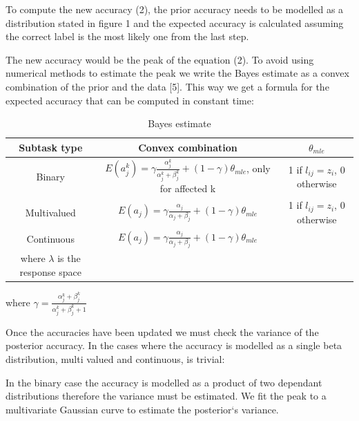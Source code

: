 \documentclass[11pt]{article}
\begin{document}
To compute the new accuracy (2), the prior accuracy needs to be modelled as a distribution stated in figure 1 and the expected accuracy is calculated assuming the correct label is the most likely one from the last step.

The new accuracy would be the peak of the equation (2). To avoid using numerical methods to estimate the peak we write the Bayes estimate as a convex combination of the prior and the data [5]. This way we get a formula for the expected accuracy that can be computed in constant time:\\

\begin{table}[htdp]
\caption{Bayes estimate}
\begin{center}
\begin{tabular}{|c|c|c|}
Subtask type & Convex combination & $\theta_{mle}$\\ \hline

Binary & $ E(a_{j}^{k}) = \gamma \frac{\alpha_{j}^{k}}{\alpha_{j}^{k} + \beta_{j}^{k}} +  (1 - \gamma)\theta_{mle}$, only for affected k & 1 if $l_{ij} = z_{i}$, 0 otherwise\\

Multivalued & $ E(a_{j}) = \gamma \frac{\alpha_{j}}{\alpha_{j} + \beta_{j}} +  (1 - \gamma)\theta_{mle}$ &1 if $l_{ij} = z_{i}$, 0 otherwise\\

Continuous & $ E(a_{j}) = \gamma \frac{\alpha_{j}}{\alpha_{j} + \beta_{j}} +  (1 - \gamma)\theta_{mle}$ & \shortstack{$\frac{\mathcal{N}(l_{ij}| z_{i}, \sum)}{\mathcal{N}(l_{ij}| z_{i}, \sum) + \lambda^{-1}}$ \\ where $\lambda$ is the response space}\\
\end{tabular}
\end{center}
\label{def}
\end{table}%

where $\gamma = \frac{\alpha_{j}^{k} + \beta_{j}^{k}}{\alpha_{j}^{k} + \beta_{j}^{k} + 1}$ 

Once the accuracies have been updated we must check the variance of the posterior accuracy. In the cases where the accuracy is modelled as a single beta distribution, multi valued and continuous, is trivial:

In the binary case the accuracy is modelled as a product of two dependant distributions therefore the variance must be estimated. We fit the peak to a multivariate Gaussian curve to estimate the posterior`s variance.
\end{document}
